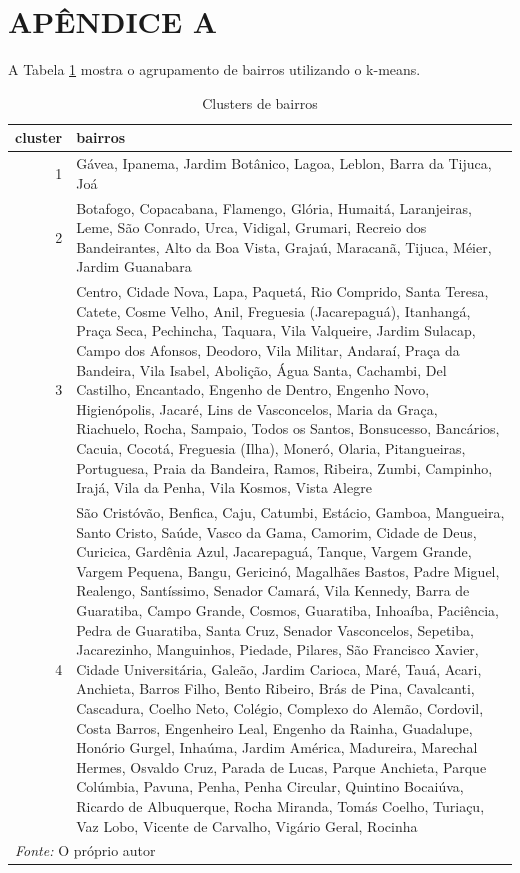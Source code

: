 \documentclass[
]{book}
\author{}
\date{\vspace{-2.5em}}
\begin{document}
\frontmatter

\mainmatter
\hypertarget{apuxeandice-a}{%
\chapter*{APÊNDICE A}\label{apuxeandice-a}}

A Tabela \ref{tab:cluster_bairros} mostra o agrupamento de bairros
utilizando o k-means.

\begin{table}

\caption{\label{tab:cluster_bairros}Clusters de bairros}
\centering
\begin{tabular}[t]{r|>{\raggedright\arraybackslash}p{15cm}}
\hline
cluster & bairros\\
\hline
1 & Gávea, Ipanema, Jardim Botânico, Lagoa, Leblon, Barra da Tijuca, Joá\\
\hline
2 & Botafogo, Copacabana, Flamengo, Glória, Humaitá, Laranjeiras, Leme, São Conrado, Urca, Vidigal, Grumari, Recreio dos Bandeirantes, Alto da Boa Vista, Grajaú, Maracanã, Tijuca, Méier, Jardim Guanabara\\
\hline
3 & Centro, Cidade Nova, Lapa, Paquetá, Rio Comprido, Santa Teresa, Catete, Cosme Velho, Anil, Freguesia (Jacarepaguá), Itanhangá, Praça Seca, Pechincha, Taquara, Vila Valqueire, Jardim Sulacap, Campo dos Afonsos, Deodoro, Vila Militar, Andaraí, Praça da Bandeira, Vila Isabel, Abolição, Água Santa, Cachambi, Del Castilho, Encantado, Engenho de Dentro, Engenho Novo, Higienópolis, Jacaré, Lins de Vasconcelos, Maria da Graça, Riachuelo, Rocha, Sampaio, Todos os Santos, Bonsucesso, Bancários, Cacuia, Cocotá, Freguesia (Ilha), Moneró, Olaria, Pitangueiras, Portuguesa, Praia da Bandeira, Ramos, Ribeira, Zumbi, Campinho, Irajá, Vila da Penha, Vila Kosmos, Vista Alegre\\
\hline
4 & São Cristóvão, Benfica, Caju, Catumbi, Estácio, Gamboa, Mangueira, Santo Cristo, Saúde, Vasco da Gama, Camorim, Cidade de Deus, Curicica, Gardênia Azul, Jacarepaguá, Tanque, Vargem Grande, Vargem Pequena, Bangu, Gericinó, Magalhães Bastos, Padre Miguel, Realengo, Santíssimo, Senador Camará, Vila Kennedy, Barra de Guaratiba, Campo Grande, Cosmos, Guaratiba, Inhoaíba, Paciência, Pedra de Guaratiba, Santa Cruz, Senador Vasconcelos, Sepetiba, Jacarezinho, Manguinhos, Piedade, Pilares, São Francisco Xavier, Cidade Universitária, Galeão, Jardim Carioca, Maré, Tauá, Acari, Anchieta, Barros Filho, Bento Ribeiro, Brás de Pina, Cavalcanti, Cascadura, Coelho Neto, Colégio, Complexo do Alemão, Cordovil, Costa Barros, Engenheiro Leal, Engenho da Rainha, Guadalupe, Honório Gurgel, Inhaúma, Jardim América, Madureira, Marechal Hermes, Osvaldo Cruz, Parada de Lucas, Parque Anchieta, Parque Colúmbia, Pavuna, Penha, Penha Circular, Quintino Bocaiúva, Ricardo de Albuquerque, Rocha Miranda, Tomás Coelho, Turiaçu, Vaz Lobo, Vicente de Carvalho, Vigário Geral, Rocinha\\
\hline
\multicolumn{2}{l}{\textit{Fonte: } O próprio autor}\\
\end{tabular}
\end{table}
\end{document}

